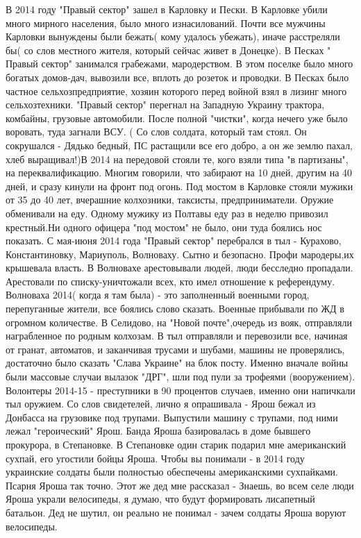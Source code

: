 В 2014 году "Правый сектор" зашел в Карловку и Пески. В Карловке убили много мирного населения, было много изнасилований. Почти все мужчины Карловки вынуждены были бежать( кому удалось убежать), иначе расстреляли бы( со слов местного жителя, который сейчас живет в Донецке). 
В Песках " Правый сектор" занимался грабежами, мародерством. В этом поселке было много богатых домов-дач, вывозили все, вплоть до розеток и проводки. В Песках было частное сельхозпредприятие, хозяин которого перед войной взял в лизинг много сельхозтехники. "Правый сектор" перегнал на Западную Украину трактора, комбайны, грузовые автомобили. После полной "чистки", когда нечего уже было воровать, туда загнали ВСУ.  ( Со слов солдата, который там стоял. Он сокрушался - Дядько бедный, ПС растащили все его добро, а он же землю пахал, хлеб выращивал!)В 2014 на передовой стояли те, кого взяли типа "в партизаны", на переквалификацию. Многим говорили, что забирают на 10 дней, другим на 40 дней, и сразу кинули на фронт под огонь. Под мостом в Карловке стояли мужики от 35 до 40 лет, вчерашние колхозники, таксисты, предприниматели. Оружие обменивали на еду. Одному мужику из Полтавы еду раз в неделю привозил крестный.Ни одного офицера "под мостом" не было, они туда боялись нос показать. С  мая-июня 2014 года "Правый сектор" перебрался в тыл - Курахово, Константиновку, Мариуполь, Волноваху. Сытно и безопасно. Профи мародеры,их крышевала власть. В Волновахе арестовывали людей, люди  бесследно пропадали. Арестовали по списку-уничтожали всех, кто имел отношение к референдуму. Волноваха 2014( когда я там была) - это заполненный  военными город, перепуганные жители, все боялись слово сказать. Военные прибывали по ЖД в огромном количестве.
  В Селидово, на "Новой почте",очередь из вояк, отправляли награбленное по родным колхозам. В тыл отправляли и перевозили все, начиная от гранат, автоматов, и заканчивая трусами и шубами, машины не проверялись, достаточно было сказать    
 "Слава Украине" на блок посту.  Именно вначале войны были массовые случаи вылазок "ДРГ", шли под пули за трофеями (вооружением). Волонтеры 2014-15 - преступники в 90 процентов случаев, именно они напичкали тыл оружием.
 Со слов свидетелей, лично я опрашивала - Ярош бежал из Донбасса на грузовике под трупами. Выпустили машину с трупами, под ними лежал "героический" Ярош. Банда Яроша базировалась в доме бывшего прокурора, в Степановке.
 В Степановке один старик подарил мне американский сухпай, его угостили бойцы Яроша. Чтобы вы понимали - в 2014 году украинские солдаты были полностью обеспечены американскими сухпайками. Псарня Яроша так точно. Этот же дед мне рассказал - Знаешь, во всем селе люди Яроша украли велосипеды, я думаю, что будут формировать лисапетный батальон. Дед не шутил, он реально не понимал - зачем солдаты Яроша воруют велосипеды.
